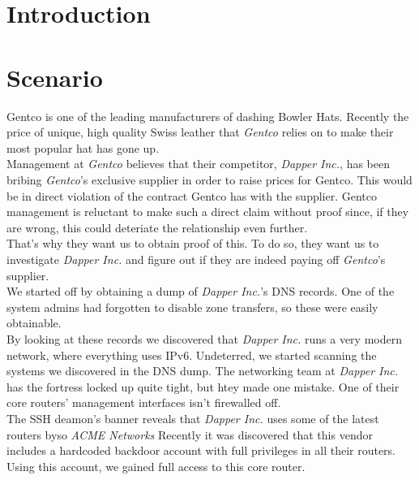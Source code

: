 \documentclass[11pt,a4paper,oneside]{article}
\title{\ftitle\\\coursecode { -} \coursename}
\author{\fauthor}
\begin{document}
    \maketitle\thispagestyle{fancy}
    \newpage
    \tableofcontents
    \newpage
    
    
    \section{Introduction}
    	
    \section{Scenario}
    		Gentco is one of the leading manufacturers of dashing Bowler Hats. Recently the price of unique, high quality Swiss leather that \textit{Gentco} relies on to make their most popular hat has gone up.\\
    		Management at \textit{Gentco} believes that their competitor, \textit{Dapper Inc.}, has been bribing \textit{Gentco}'s exclusive supplier in order to raise prices for Gentco. This would be in direct violation of the contract Gentco has with the supplier. Gentco management is reluctant to make such a direct claim without proof since, if they are wrong, this could deteriate the relationship even further.\\
    		That's why they want us to obtain proof of this. To do so, they want us to investigate \textit{Dapper Inc.} and figure out if they are indeed paying off \textit{Gentco}'s supplier.\\
    		We started off by obtaining a dump of \textit{Dapper Inc.}'s DNS records. One of the system admins had forgotten to disable zone transfers, so these were easily obtainable.\\
    		By looking at these records we discovered that \textit{Dapper Inc.} runs a very modern network, where everything uses IPv6. Undeterred, we started scanning the systems we discovered in the DNS dump. The networking team at \textit{Dapper Inc.} has the fortress locked up quite tight, but htey made one mistake. One of their core routers' management interfaces isn't firewalled off.\\
    		The SSH deamon's banner reveals that \textit{Dapper Inc.} uses some of the latest routers byso \textit{ACME Networks} Recently it was discovered that this vendor includes a hardcoded backdoor account with full privileges in all their routers. Using this account, we gained full access to this core router.\\
\end{document}
